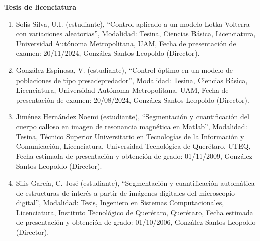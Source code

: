 {\large \textbf{Tesis de licenciatura}}

\hrulefill

\begin{enumerate}

\item Solis Silva, U.I. (estudiante), “Control aplicado a un modelo Lotka-Volterra con variaciones 
aleatorias”, 
Modalidad: Tesina, Ciencias Básica, Licenciatura, Universidad Autónoma Metropolitana, UAM, Fecha de 
presentación de examen: 20/11/2024, González Santos Leopoldo (Director).

\item González Espinosa, V. (estudiante), “Control óptimo en un modelo de poblaciones de tipo 
presadepredador”, 
Modalidad: Tesina, Ciencias Básica, Licenciatura, Universidad Autónoma Metropolitana, UAM, Fecha de 
presentación de examen: 20/08/2024, González Santos Leopoldo (Director).

\item Jiménez Hernández Noemi (estudiante), “Segmentación y cuantificación del cuerpo calloso en imagen de 
resonancia magnética en Matlab”, Modalidad: Tesina, Técnico Superior Universitario en Tecnologías de la 
Información y Comunicación, Licenciatura, Universidad Tecnológica de Querétaro, UTEQ, Fecha estimada de 
presentación y obtención de grado: 01/11/2009, González Santos Leopoldo (Director).

\item Silis García, C. José (estudiante), “Segmentación y cuantificación automática de estructuras de interés 
a 
partir de imágenes digitales del microscopio digital”, Modalidad: Tesis, Ingeniero en Sistemas 
Computacionales, Licenciatura, Instituto Tecnológico de Querétaro, Querétaro, Fecha estimada de presentación y 
obtención de grado: 01/10/2006, González Santos Leopoldo (Director).

\end{enumerate}

